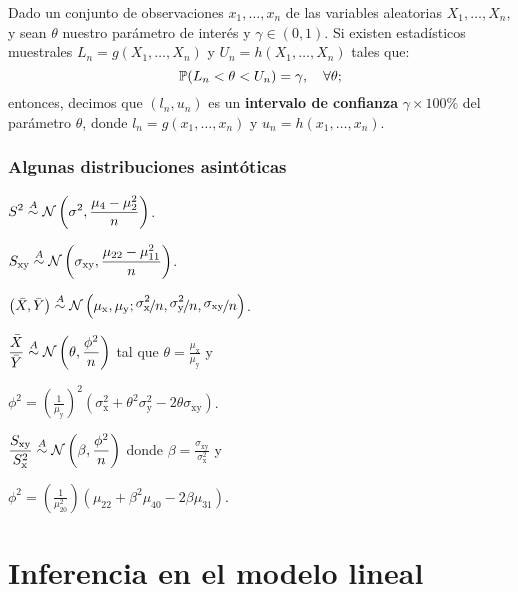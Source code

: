 \documentclass[8pt,a4paper]{extarticle}
\begin{document}
\begin{multicols}{3}
	\begin{boxdef}
		Dado un conjunto de observaciones $x_1, \dots, x_n$ de las variables aleatorias $X_1, \dots, X_n$, y sean $\theta$ nuestro parámetro de interés y $\gamma\in(0,1)$. Si existen estadísticos muestrales $L_n = g(X_1, \dots, X_n)$ y $U_n = h(X_1, \dots, X_n)$ tales que: $$\P(L_n < \theta < U_n) = \gamma, \quad \forall \theta;$$ entonces, decimos que $(l_n,u_n)$ es un \textbf{intervalo de confianza} $\gamma \times 100 \%$ del parámetro $\theta$, donde $l_n = g(x_1, \dots, x_n)$ y $u_n = h(x_1, \dots, x_n)$.
	\end{boxdef}

	\newpage

	\subsubsection*{Algunas distribuciones asintóticas}

	\begin{eqlist}
		\item $\displaystyle S^2 \overset{A}{\sim} \Norm\left(\sigma^2, \frac{\mu_4 - \mu_2^2}{n}\right)$.
		\item $\displaystyle S_{\mathrm{xy}} \overset{A}{\sim} \Norm \left( \sigma_{\mathrm{xy}}, \frac{\mu_{22} - \mu_{11}^2}{n} \right)$.
		\item $\left( \bar{X}, \bar{Y} \right) \overset{A}{\sim} \Norm \left( \mu_{\mathrm{x}}, \mu_{\mathrm{y}}; \nicefrac{ \displaystyle \sigma^2_{\mathrm{x}}}{ \displaystyle n}, \nicefrac{ \displaystyle \sigma^2_{\mathrm{y}}}{ \displaystyle n}, \nicefrac{ \displaystyle \sigma_{\mathrm{xy}}}{ \displaystyle n} \right)$.
		\item $\displaystyle \frac{\bar{X}}{\bar{Y}} \overset{A}{\sim} \Norm \left( \theta, \frac{\phi^2}{n} \right) $ tal que $\displaystyle \theta = \frac{\mu_{\mathrm{x}}}{\mu_{\mathrm{y}}}$ y \par $\displaystyle \phi^2 = \left( \frac{1}{\mu_{\mathrm{y}}} \right)^2 \left( \sigma^2_\mathrm{x} + \theta^2 \sigma^2_\mathrm{y} - 2\theta\sigma_\mathrm{xy} \right) $.
		\item $\displaystyle \frac{S_{\mathrm{xy}}}{S^2_\mathrm{x}} \overset{A}{\sim} \Norm \left( \beta, \frac{\phi^2}{n} \right)$ donde $\displaystyle \beta = \frac{\sigma_\mathrm{xy}}{\sigma_\mathrm{x}^2}$ y \par $\displaystyle \phi^2 = \left( \frac{1}{\mu^2_{20}} \right) \left( \mu_{22} + \beta^2 \mu_{40} - 2\beta\mu_{31} \right)$.
	\end{eqlist}

	\newpage
	\section{Inferencia en el modelo lineal}

	\vfill\eject
	\columnbreak
\end{multicols}
\end{document}
